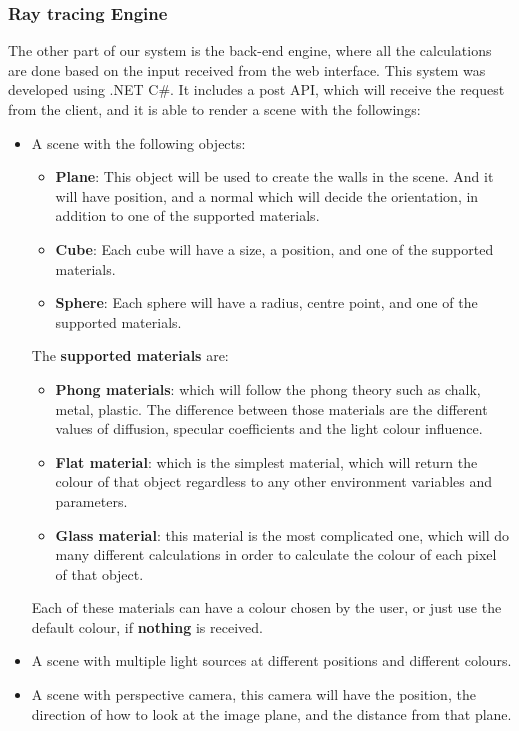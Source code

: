 \documentclass{article}
\begin{document}
	\subsubsection{Ray tracing Engine}
	The other part of our system is the back-end engine, where all the calculations are done based on the input received from the web interface. This system was developed using .NET C\#. It includes a post API, which will receive the request from the client, and it is able to render a scene with the followings:
	\begin{itemize}
		\item A scene with the following objects:
		\begin{itemize}
			\item \textbf{Plane}: This object will be used to create the walls in the scene. And it will have position, and a normal which will decide the orientation, in addition to one of the supported materials.
			\item \textbf{Cube}: Each cube will have a size, a position, and one of the supported materials.
			\item \textbf{Sphere}: Each sphere will have a radius, centre point, and one of the supported materials.
		\end{itemize}
		The  \textbf{supported materials} are:
		\begin{itemize}
			\item \textbf{Phong materials}:  which will follow the phong theory such as chalk, metal, plastic. The difference between those materials are the different values of diffusion, specular coefficients and the light colour influence.
			\item \textbf{Flat material}: which is the simplest material, which will return the colour of that object regardless to any other environment variables and parameters.
			\item \textbf {Glass material}: this material is the most complicated one, which will do many different calculations in order to calculate the colour of each pixel of that object.
		\end{itemize}
		Each of these materials can have a colour chosen by the user, or just use the default colour, if \textbf{nothing} is received.
		\item A scene with multiple light sources at different positions and different colours.
		\item A scene with perspective camera, this camera will have the position, the direction of how to look at the image plane, and the distance from that plane.
	\end{itemize}
\end{document}
